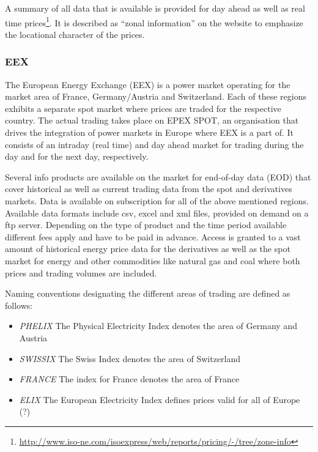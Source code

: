 
A summary of all data that is available is provided for day ahead as well as real time prices\footnote{\url{http://www.iso-ne.com/isoexpress/web/reports/pricing/-/tree/zone-info}}. It is described as ``zonal information'' on the website to emphasize the locational character of the prices. 


\subsubsection{EEX}

The European Energy Exchange (EEX) is a power market operating for the market area of France, Germany/Austria and Switzerland. Each of these regions exhibits a separate spot market where prices are traded for the respective country. 
The actual trading takes place on EPEX SPOT, an organisation that drives the integration of power markets in Europe where EEX is a part of. It consists of an intraday (real time) and day ahead market for trading during the day and for the next day, respectively. 

Several info products are available on the market for end-of-day data (EOD) that cover historical as well as current trading data from the spot and derivatives markets. 
Data is available on subscription for all of the above mentioned regions. Available data formats include csv, excel and xml files, provided on demand on a ftp server. 
Depending on the type of product and the time period available different fees apply and have to be paid in advance. 
Access is granted to a vast amount of historical energy price data for the derivatives as well as the spot market for energy and other commodities like natural gas and coal where both prices and trading volumes are included. 

Naming conventions designating the different areas of trading are defined as follows: 

\begin{itemize}

\item \emph{PHELIX} The Physical Electricity Index denotes the area of Germany and Austria

\item \emph{SWISSIX} The Swiss Index denotes the area of Switzerland

\item \emph{FRANCE} The index for France denotes the area of France

\item \emph{ELIX} The European Electricity Index defines prices valid for all of Europe (?)

\end{itemize}


